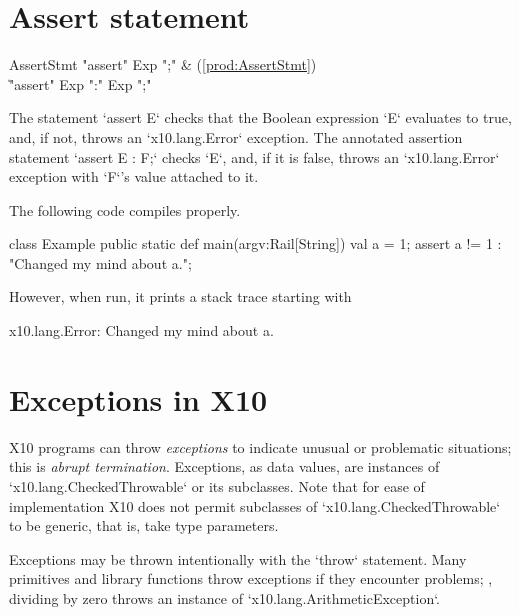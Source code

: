 \section{Assert statement} 

\begin{bbgrammar}
          AssertStmt \: \xcd"assert" Exp \xcd";" & (\ref{prod:AssertStmt}) \\
                     \| \xcd"assert" Exp  \xcd":" Exp  \xcd";" \\
\end{bbgrammar}

The statement \xcd`assert E` checks that the Boolean expression \xcd`E`
evaluates to true, and, if not, throws an \xcd`x10.lang.Error`  exception.  
The annotated assertion statement \xcd`assert E : F;` checks \xcd`E`, and, if
it is 
false, throws an \xcd`x10.lang.Error` exception with \xcd`F`'s value attached
to it. 

\begin{ex}
The following code compiles properly.  
% 
\begin{xten}
class Example {
  public static def main(argv:Rail[String]) {
    val a = 1;
    assert a != 1 : "Changed my mind about a.";
  }
}
\end{xten}
\noindent
However, when run, it 
prints a stack trace starting with 
\begin{xten}
x10.lang.Error: Changed my mind about a.
\end{xten}
\end{ex}

\section{Exceptions in X10}

X10 programs can throw {\em exceptions} to indicate unusual or problematic
situations; this is {\em abrupt termination}.  Exceptions, as data values, are
instances of \xcd`x10.lang.CheckedThrowable` or its subclasses. Note
that for ease of implementation X10 does not permit subclasses of
\xcd`x10.lang.CheckedThrowable` to be generic, that is, take type
parameters.   

Exceptions may be thrown intentionally with the
\xcd`throw` statement. Many primitives and library functions throw exceptions
if they encounter problems; \eg, dividing by zero throws an instance of
\xcd`x10.lang.ArithmeticException`. 

